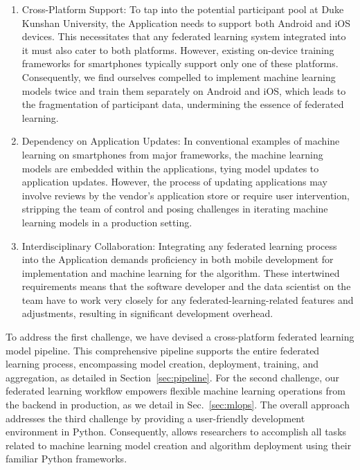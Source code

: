 \begin{enumerate}
    \item Cross-Platform Support:
          To tap into the potential participant pool at Duke Kunshan University,
          the \fedcampus Application needs to support both Android and iOS
          devices.
          This necessitates that any federated learning system integrated into
          it must also cater to both platforms. However,
          existing on-device training frameworks for smartphones typically
          support only one of these platforms. Consequently,
          we find ourselves compelled to implement machine learning models twice
          and train them separately on Android and iOS,
          which leads to the fragmentation of participant data,
          undermining the essence of federated learning.
    \item Dependency on Application Updates:
          In conventional examples of machine learning on smartphones from major
          frameworks,
          the machine learning models are embedded within the applications,
          tying model updates to application updates. However,
          the process of updating applications may involve reviews by the
          vendor's application store or require user intervention,
          stripping the \fedcampus team of control and posing challenges in
          iterating machine learning models in a production setting.
    \item Interdisciplinary Collaboration:
          Integrating any federated learning process into the \fedcampus
          Application demands proficiency in both mobile development for
          implementation and machine learning for the algorithm.
          These intertwined requirements means that the software developer and
          the data scientist on the \fedcampus team have to work very closely
          for any federated-learning-related features and adjustments,
          resulting in significant development overhead.
\end{enumerate}

To address the first challenge,
we have devised a cross-platform federated learning model pipeline.
This comprehensive pipeline supports the entire federated learning process,
encompassing model creation, deployment, training, and aggregation,
as detailed in Section~\ref{sec:pipeline}. For the second challenge,
our federated learning workflow empowers flexible machine learning operations
from the backend in production, as we detail in Sec.~\ref{sec:mlops}.
The overall approach addresses the third challenge by providing a user-friendly
development environment in Python. Consequently,
\fedkit allows researchers to accomplish all tasks related to machine learning
model creation and algorithm deployment using their familiar Python frameworks.

